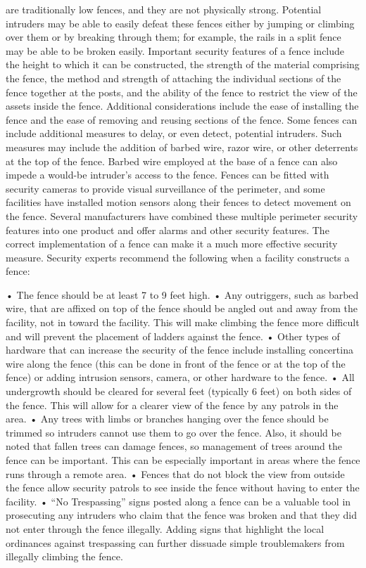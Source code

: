 \documentclass{article}
\begin{document}
are traditionally low fences, and they are not physically strong.
Potential intruders may be able to easily defeat these fences either by
jumping or climbing over them or by breaking through them; for example,
the rails in a split fence may be able to be broken easily. Important
security features of a fence include the height to which it can be
constructed, the strength of the material comprising the fence, the
method and strength of attaching the individual sections of the fence
together at the posts, and the ability of the fence to restrict the view
of the assets inside the fence. Additional considerations include the
ease of installing the fence and the ease of removing and reusing
sections of the fence. Some fences can include additional measures to
delay, or even detect, potential intruders. Such measures may include
the addition of barbed wire, razor wire, or other deterrents at the top
of the fence. Barbed wire employed at the base of a fence can also
impede a would-be intruder's access to the fence. Fences can be fitted
with security cameras to provide visual surveillance of the perimeter,
and some facilities have installed motion sensors along their fences to
detect movement on the fence. Several manufacturers have combined these
multiple perimeter security features into one product and offer alarms
and other security features. The correct implementation of a fence can
make it a much more effective security measure. Security experts
recommend the following when a facility constructs a fence:

• The fence should be at least 7 to 9 feet high. • Any outriggers, such
as barbed wire, that are affixed on top of the fence should be angled
out and away from the facility, not in toward the facility. This will
make climbing the fence more difficult and will prevent the placement of
ladders against the fence. • Other types of hardware that can increase
the security of the fence include installing concertina wire along the
fence (this can be done in front of the fence or at the top of the
fence) or adding intrusion sensors, camera, or other hardware to the
fence. • All undergrowth should be cleared for several feet (typically 6
feet) on both sides of the fence. This will allow for a clearer view of
the fence by any patrols in the area. • Any trees with limbs or branches
hanging over the fence should be trimmed so intruders cannot use them to
go over the fence. Also, it should be noted that fallen trees can damage
fences, so management of trees around the fence can be important. This
can be especially important in areas where the fence runs through a
remote area. • Fences that do not block the view from outside the fence
allow security patrols to see inside the fence without having to enter
the facility. • ``No Trespassing'' signs posted along a fence can be a
valuable tool in prosecuting any intruders who claim that the fence was
broken and that they did not enter through the fence illegally. Adding
signs that highlight the local ordinances against trespassing can
further dissuade simple troublemakers from illegally climbing the fence.
\end{document}
